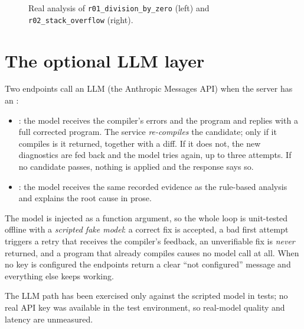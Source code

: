 \begin{figure}[H]
\begin{minipage}[t]{0.49\textwidth}\begingroup\lstset{style=tiny}\endgroup\end{minipage}\hfill
\begin{minipage}[t]{0.49\textwidth}\begingroup\lstset{style=tiny}\endgroup\end{minipage}
\caption{Real analysis of \texttt{r01\_division\_by\_zero} (left) and \texttt{r02\_stack\_overflow} (right).}
\end{figure}


\section{The optional LLM layer}
Two endpoints call an LLM (the Anthropic Messages API) when the server has an :
\begin{itemize}
  \item {}: the model receives the compiler's errors and the program and replies with a full corrected program. The service \emph{re-compiles} the candidate; only if it compiles is it returned, together with a diff. If it does not, the new diagnostics are fed back and the model tries again, up to three attempts. If no candidate passes, nothing is applied and the response says so.
  \item {}: the model receives the same recorded evidence as the rule-based analysis and explains the root cause in prose.
\end{itemize}
The model is injected as a function argument, so the whole loop is unit-tested offline with a \emph{scripted fake model}: a correct fix is accepted, a bad first attempt triggers a retry that receives the compiler's feedback, an unverifiable fix is \emph{never} returned, and a program that already compiles causes no model call at all. When no key is configured the endpoints return a clear ``not configured'' message and everything else keeps working.

\begin{warnbox}
The LLM path has been exercised only against the scripted model in tests; no real API key was available in the test environment, so real-model quality and latency are unmeasured.
\end{warnbox}

